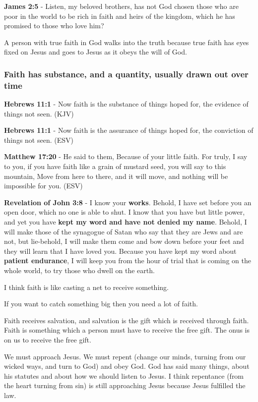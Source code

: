 \documentclass[11pt]{article}
\begin{document}
\textbf{James 2:5} - Listen, my beloved brothers, has not God chosen those who are poor in the world to be rich in faith and heirs of the kingdom, which he has promised to those who love him?

A person with true faith in God walks into the truth because true faith has eyes fixed on Jesus and goes to Jesus as it obeys the will of God.

\subsubsection{Faith has substance, and a quantity, usually drawn out over time}
\label{sec:orgea29509}
\textbf{Hebrews 11:1} - Now faith is the substance of things hoped for, the evidence of things not seen. (KJV)

\textbf{Hebrews 11:1} - Now faith is the assurance of things hoped for, the conviction of things not seen. (ESV)

\textbf{Matthew 17:20} - He said to them, Because of your little faith. For truly, I say to you, if you have faith like a grain of mustard seed, you will say to this mountain, Move from here to there, and it will move, and nothing will be impossible for you. (ESV)

\textbf{Revelation of John 3:8} - I know your \textbf{works}. Behold, I have set before you an open door, which no one is able to shut. I know that you have but little power, and yet you have \textbf{kept my word and have not denied my name}. Behold, I will make those of the synagogue of Satan who say that they are Jews and are not, but lie-behold, I will make them come and bow down before your feet and they will learn that I have loved you. Because you have kept my word about \textbf{patient endurance}, I will keep you from the hour of trial that is coming on the whole world, to try those who dwell on the earth.

I think faith is like casting a net to receive something.

If you want to catch something big then you need a lot of faith.

Faith receives salvation, and salvation is the gift which is received through faith.
Faith is something which a person must have to receive the free gift.
The onus is on us to receive the free gift.

We must approach Jesus.
We must repent (change our minds, turning from our wicked ways, and turn to God) and obey God.
God has said many things, about his statutes and about how we should listen to Jesus.
I think repentance (from the heart turning from sin) is still approaching Jesus because Jesus fulfilled the law.
\end{document}
